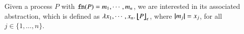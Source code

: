 Given a process $P$ with $\mathtt{fn}(P) = m_1, \cdots, m_n$, we are interested in its associated abstraction, which is defined as
$\lambda x_1, \cdots, x_n.\,\big\lfloor\!\!\big\lfloor P\big\rfloor\!\!\big\rfloor^{}_\epsilon$, where $|\!|m_j|\!| = x_j$, for all $j \in \{1, \ldots, n\}$. 


